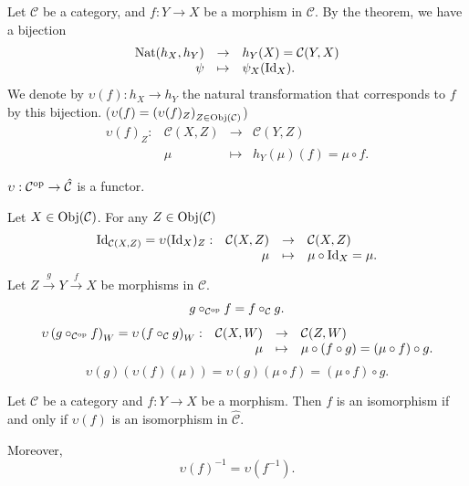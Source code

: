 \begin{notationenv}
    Let $\mathcal{C}$ be a category, and $f:Y\rightarrow X$ be a morphism in $\mathcal{C}$. By the theorem, we have a bijection
    $$\begin{array}{rcl}
        \mathrm{Nat}(h_X,h_Y)&\rightarrow &h_Y(X)=\mathcal{C}(Y,X)\\
        \psi&\mapsto&\psi_X(\mathrm{Id}_X).
    \end{array}$$
    We denote by $\upsilon(f):h_X\rightarrow h_Y$ the natural transformation that corresponds to $f$ by this bijection. ($\upsilon(f)= \left(\upsilon(f)_Z\right)_{Z\in \mathrm{Obj}(\mathcal{C})}$)
    $$ \begin{array}{rrcl}
        \upsilon(f)_{Z} :& \mathcal{C}(X,Z)&\rightarrow&\mathcal{C}(Y,Z)\\
        &\mu&\mapsto& h_Y(\mu)(f)=\mu\circ f.
    \end{array}
    $$
\end{notationenv}
\begin{propositionenv}
    $\upsilon: \mathcal{C}^{\mathrm{op}}\rightarrow\hat{\mathcal{C}}$ is a functor.
\end{propositionenv}
\begin{proofenv}
    Let $X\in \mathrm{Obj}(\mathcal{C})$. For any $Z\in \mathrm{Obj}(\mathcal{C})$
    $$\begin{array}{rrcl}
        \mathrm{Id}_{\mathcal{C}(X,Z)}=\upsilon(\mathrm{Id}_{X})_Z:&\mathcal{C}(X,Z)&\rightarrow&\mathcal{C}(X,Z)\\
        &\mu&\mapsto&\mu\circ\mathrm{Id}_X=\mu.
    \end{array}
    $$
    Let $Z\overset{g}{\longrightarrow}Y\overset{f}{\longrightarrow}X$ be morphisms in $\mathcal{C}$.
    $$g\circ_{\mathcal{C}^{\mathrm{op}}} f=f\circ_{\mathcal{C}} g.$$
    $$\begin{array}{rrcl}
        \upsilon\left(g\circ_{\mathcal{C}^{\mathrm{op}}} f\right)_{W}= \upsilon\left(f\circ_{\mathcal{C}}g\right)_{W} :& \mathcal{C}(X,W)&\rightarrow &\mathcal{C}(Z,W)\\
        &\mu &\mapsto & \mu\circ \left(f\circ g\right)= \left(\mu\circ f\right)\circ g.
    \end{array}
    $$
    $$\upsilon(g)\left(\upsilon(f)(\mu)\right) = \upsilon(g)\left(\mu\circ f\right) = \left(\mu\circ f\right)\circ g.$$
\end{proofenv}
\begin{propositionenv}
    Let $\mathcal{C}$ be a category and $f:Y\rightarrow X$ be a morphism. Then $f$ is an isomorphism if and only if $\upsilon(f)$ is an isomorphism in $\hat{\mathcal{C}}$.

    Moreover, $$\upsilon(f)^{-1} = \upsilon(f^{-1}).$$
\end{propositionenv}
